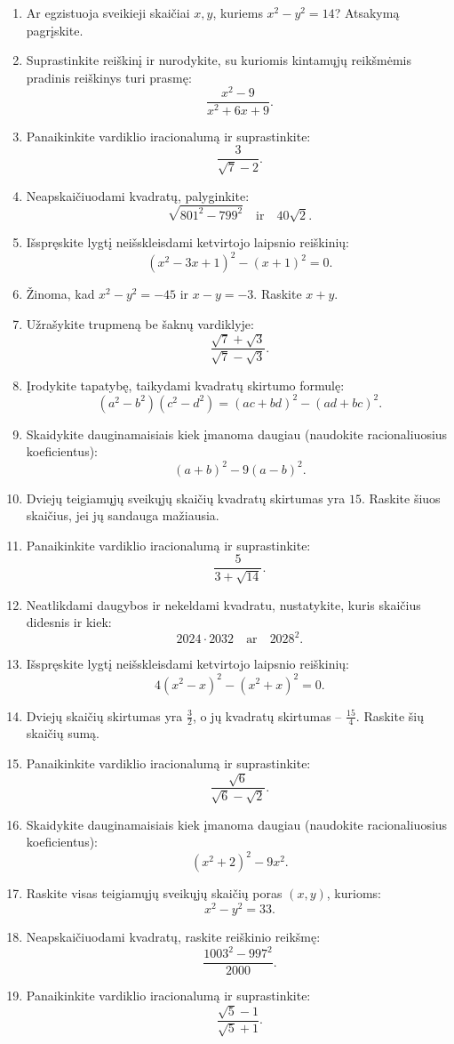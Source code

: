 \documentclass[11pt,a4paper]{article}
\begin{document}
\begin{enumerate}
\item Ar egzistuoja sveikieji skaičiai \(x,y\), kuriems \(x^2-y^2=14\)? Atsakymą pagrįskite.
\item Suprastinkite reiškinį ir nurodykite, su kuriomis kintamųjų reikšmėmis pradinis reiškinys turi prasmę:\[\frac{x^2-9}{x^2+6x+9}.\]
\item Panaikinkite vardiklio iracionalumą ir suprastinkite:\[\frac3{\sqrt7-2}.\]
\item Neapskaičiuodami kvadratų, palyginkite:\[\sqrt{801^2-799^2}\quad\text{ir}\quad40\sqrt2.\]
\item Išspręskite lygtį neišskleisdami ketvirtojo laipsnio reiškinių:\[(x^2-3x+1)^2-(x+1)^2=0.\]
\item Žinoma, kad \(x^2-y^2=-45\) ir \(x-y=-3\). Raskite \(x+y\).
\item Užrašykite trupmeną be šaknų vardiklyje:\[\frac{\sqrt7+\sqrt3}{\sqrt7-\sqrt3}.\]
\item Įrodykite tapatybę, taikydami kvadratų skirtumo formulę:\[(a^2-b^2)(c^2-d^2)=(ac+bd)^2-(ad+bc)^2.\]
\item Skaidykite dauginamaisiais kiek įmanoma daugiau (naudokite racionaliuosius koeficientus):\[(a+b)^2-9(a-b)^2.\]
\item Dviejų teigiamųjų sveikųjų skaičių kvadratų skirtumas yra \(15\). Raskite šiuos skaičius, jei jų sandauga mažiausia.
\item Panaikinkite vardiklio iracionalumą ir suprastinkite:\[\frac5{3+\sqrt{14}}.\]
\item Neatlikdami daugybos ir nekeldami kvadratu, nustatykite, kuris skaičius didesnis ir kiek:\[2024\cdot2032\quad\text{ar}\quad2028^2.\]
\item Išspręskite lygtį neišskleisdami ketvirtojo laipsnio reiškinių:\[4(x^2-x)^2-(x^2+x)^2=0.\]
\item Dviejų skaičių skirtumas yra \(\frac32\), o jų kvadratų skirtumas -- \(\frac{15}{4}\). Raskite šių skaičių sumą.
\item Panaikinkite vardiklio iracionalumą ir suprastinkite:\[\frac{\sqrt6}{\sqrt6-\sqrt2}.\]
\item Skaidykite dauginamaisiais kiek įmanoma daugiau (naudokite racionaliuosius koeficientus):\[(x^2+2)^2-9x^2.\]
\item Raskite visas teigiamųjų sveikųjų skaičių poras \((x,y)\), kurioms:\[x^2-y^2=33.\]
\item Neapskaičiuodami kvadratų, raskite reiškinio reikšmę:\[\frac{1003^2-997^2}{2000}.\]
\item Panaikinkite vardiklio iracionalumą ir suprastinkite:\[\frac{\sqrt5-1}{\sqrt5+1}.\]

\end{enumerate}
\end{document}
